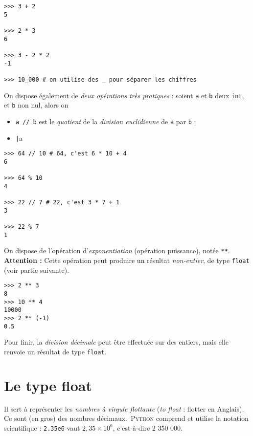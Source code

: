 \begin{pys}\begin{verbatim}
>>> 3 + 2
5

>>> 2 * 3
6

>>> 3 - 2 * 2
-1

>>> 10_000 # on utilise des _ pour séparer les chiffres
\end{verbatim}
\end{pys}

On dispose également de \textit{deux opérations très pratiques} : soient \texttt{a} et \texttt{b} deux \texttt{int}, et \texttt{b} non nul, alors on 
\begin{itemize}
  \item \texttt{a // b} est le \textit{quotient} de la \textit{division euclidienne} de \texttt{a} par \texttt{b} ;  
  \item \texttt|a %
\end{itemize}


\begin{pys}\begin{verbatim}
>>> 64 // 10 # 64, c'est 6 * 10 + 4
6

>>> 64 % 10
4

>>> 22 // 7 # 22, c'est 3 * 7 + 1
3

>>> 22 % 7
1
\end{verbatim}
\end{pys}


On dispose de l'opération d'\textit{exponentiation} (opération puissance), notée \texttt{**}.\\
\textbf{Attention :} Cette opération peut produire un résultat \textit{non-entier}, de type \texttt{float} (voir partie suivante).

\begin{pys}\begin{verbatim}
>>> 2 ** 3
8
>>> 10 ** 4
10000
>>> 2 ** (-1)
0.5
\end{verbatim}
\end{pys}

Pour finir, la \textit{division décimale} peut être effectuée sur des entiers, mais elle renvoie un résultat de type \texttt{float}.

\section{Le type float}
Il sert à représenter les \textit{nombres à virgule flottante} (\textit{to float} : flotter en Anglais). Ce sont (en gros) des nombres
décimaux.\ \textsc{Python} comprend et utilise la notation scientifique : \texttt{2.35e6} vaut $2,35\times 10^6$, c'est-à-dire 2 350 000.

